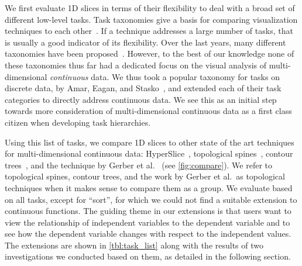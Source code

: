 We first evaluate 1D slices in terms of their flexibility to deal with a broad
set of different low-level tasks.  Task taxonomies give a basis for comparing
visualization techniques to each other~\cite{Munzner:2014}.
If a technique addresses a large number of tasks, that is usually a good
indicator of its flexibility.  Over the last years, many different taxonomies
have been proposed~\cite{Amar:2005,brehmer:2013,Heer:2012,Sedlmair:2014}.
However, to the best of our knowledge none of these taxonomies thus far had a
dedicated focus on the visual analysis of multi-dimensional \textit{continuous}
data. We thus took a popular taxonomy for tasks on discrete data, by Amar,
Eagan, and Stasko~\cite{Amar:2005}, and extended each of their task categories
to directly address continuous data. We see this as an initial step towards
more consideration of multi-dimensional continuous data as a first class
citizen when developing task hierarchies.

Using this list of tasks, we compare 1D slices to other state of the art
techniques for multi-dimensional continuous data: HyperSlice~\cite{Wijk:1993},
topological spines~\cite{Correa:2011}, contour trees~\cite{Carr:2003}, and the
technique by Gerber et al.~\cite{Gerber:2010} (see \autoref{fig:compare}).  We
refer to topological spines, contour trees, and the work by Gerber et al.\ as
topological techniques when it makes sense to compare them as a group.
We evaluate based on all tasks, except for ``sort'', for which we could not
find a suitable extension to continuous functions.  The guiding theme in our
extensions is that users want to view the relationship of independent variables
to the dependent variable and to see how the dependent variable changes with
respect to the independent values.  The extensions are shown in
\autoref{tbl:task_list} along with the results of two investigations we
conducted based on them, as detailed in the following section.





%


